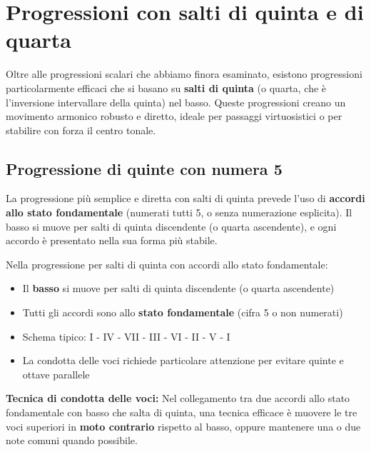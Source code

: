 \section{Progressioni con salti di quinta e di quarta}
\label{sec:progressioni_salti_quinta}

Oltre alle progressioni scalari che abbiamo finora esaminato, esistono progressioni particolarmente efficaci che si basano su \textbf{salti di quinta} (o quarta, che è l'inversione intervallare della quinta) nel basso. Queste progressioni creano un movimento armonico robusto e diretto, ideale per passaggi virtuosistici o per stabilire con forza il centro tonale.

\subsection{Progressione di quinte con numera 5}
\label{subsec:progressione_quinte_5}

La progressione più semplice e diretta con salti di quinta prevede l'uso di \textbf{accordi allo stato fondamentale} (numerati tutti 5, o senza numerazione esplicita). Il basso si muove per salti di quinta discendente (o quarta ascendente), e ogni accordo è presentato nella sua forma più stabile.

\begin{regola}
	\label{reg:progressione_5}
	Nella progressione per salti di quinta con accordi allo stato fondamentale:
	
	\begin{itemize}
		\item Il \textbf{basso} si muove per salti di quinta discendente (o quarta ascendente)
		\item Tutti gli accordi sono allo \textbf{stato fondamentale} (cifra 5 o non numerati)
		\item Schema tipico: I - IV - VII - III - VI - II - V - I
		\item La condotta delle voci richiede particolare attenzione per evitare quinte e ottave parallele
	\end{itemize}
	
	\textbf{Tecnica di condotta delle voci:}
	Nel collegamento tra due accordi allo stato fondamentale con basso che salta di quinta, una tecnica efficace è muovere le tre voci superiori in \textbf{moto contrario} rispetto al basso, oppure mantenere una o due note comuni quando possibile.
\end{regola}

